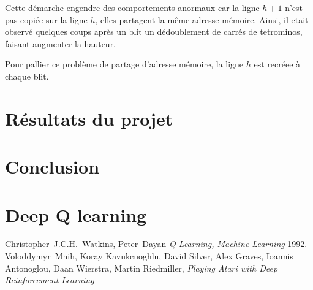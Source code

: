 \documentclass{article}
\begin{document}
Cette démarche engendre des comportements anormaux car la ligne \(h+1\) n'est
pas copiée sur la ligne \(h\), elles partagent la même adresse mémoire. Ainsi,
il etait observé quelques coups après un blit un dédoublement de carrés de
tetrominos, faisant augmenter la hauteur.

Pour pallier ce problème de partage d'adresse mémoire, la ligne \(h\) est
recréee à chaque blit.

\section{R\'esultats du projet}

\section*{Conclusion}

\appendix
\section{Deep Q learning}

\begin{thebibliography}{9}
    Christopher~J.C.H.~Watkins, Peter~Dayan
    \textit{Q-Learning, Machine Learning}
    1992.
    Voloddymyr~Mnih, Koray Kavukcuoghlu, David Silver, Alex Graves, Ioannis
    Antonoglou, Daan Wierstra, Martin Riedmiller,
    \textit{Playing Atari with Deep Reinforcement Learning}
\end{thebibliography}
\end{document}
